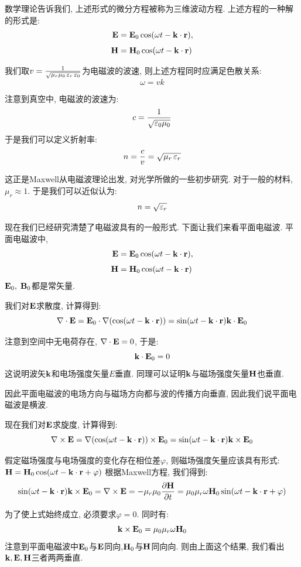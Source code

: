 数学理论告诉我们, 上述形式的微分方程被称为三维波动方程. 上述方程的一种解的形式是:
\begin{align*}
\mathbf{E} &= \mathbf{E}_0 \cos(\omega t - \mathbf k \cdot \mathbf r), \\[4pt]
\mathbf{H} &= \mathbf{H}_0 \cos(\omega t - \mathbf k \cdot \mathbf r)
\end{align*}


我们取$v=\frac{1}{\sqrt{\mu_r\mu_0\mathop{}\!\varepsilon_r\mathop{}\!\varepsilon_0}}$为电磁波的波速, 则上述方程同时应满足色散关系:
\[
\omega = vk
\]

注意到真空中, 电磁波的波速为:
\[
c= \frac{1}{\sqrt{\mathop{}\!\varepsilon_0\mu_0}}
\]
于是我们可以定义折射率:
\[
n = \frac{c}{v} = \sqrt{\mu_r\mathop{}\!\varepsilon_r}
\]

这正是Maxwell从电磁波理论出发, 对光学所做的一些初步研究. 对于一般的材料,$\mu_r\approx 1$. 于是我们可以近似认为:
\[
n = \sqrt{\mathop{}\!\varepsilon_r}
\]

现在我们已经研究清楚了电磁波具有的一般形式. 下面让我们来看平面电磁波. 平面电磁波中,
\begin{align*}
\mathbf{E} &= \mathbf{E}_0 \cos(\omega t - \mathbf k \cdot \mathbf r), \\[4pt]
\mathbf{H} &= \mathbf{H}_0 \cos(\omega t - \mathbf k \cdot \mathbf r)
\end{align*}
$\mathbf{E}_0,\; \mathbf{B}_0$都是常矢量.

我们对$\mathbf{E}$求散度, 计算得到:
\[
\nabla \cdot \mathbf{E} = \mathbf{E}_0 \cdot \nabla(\cos(\omega t -\mathbf{k}\cdot \mathbf{r})) = \sin(\omega t- \mathbf{k}\cdot \mathbf{r})\mathbf{k}\cdot \mathbf{E}_0
\]

注意到空间中无电荷存在, $\nabla \cdot \mathbf{E}=0$, 于是:
\[
\mathbf{k}\cdot \mathbf{E}_0 = 0
\]
这说明波矢$\mathbf{k}$和电场强度矢量$E$垂直. 同理可以证明$\mathbf{k}$与磁场强度矢量$\mathbf{H}$也垂直.

因此平面电磁波的电场方向与磁场方向都与波的传播方向垂直, 因此我们说平面电磁波是横波.

现在我们对$\mathbf{E}$求旋度, 计算得到:
\[
\nabla\times\mathbf{E} =  \nabla(\cos(\omega t -\mathbf{k}\cdot \mathbf{r}))\times \mathbf{E}_0 = \sin(\omega t- \mathbf{k}\cdot \mathbf{r})\mathbf{k}\times \mathbf{E}_0
\]

假定磁场强度与电场强度的变化存在相位差$\varphi$, 则磁场强度矢量应该具有形式:$\mathbf{H} = \mathbf{H}_0 \cos(\omega t - \mathbf k \cdot \mathbf r+\varphi)$ 根据Maxwell方程, 我们得到:
\[
\sin(\omega t- \mathbf{k}\cdot \mathbf{r})\mathbf{k}\times \mathbf{E}_0= \nabla \times \mathbf{E} = -\mu_r\mu_0\frac{\partial\mathbf{H}}{\partial t} = \mu_0 \mu_r \omega \mathbf{H}_0\sin(\omega t- \mathbf{k}\cdot \mathbf{r}+\varphi)
\]

为了使上式始终成立, 必须要求$\varphi = 0$. 同时有:
\[
\mathbf{k} \times \mathbf{E}_0 = \mu_0\mu_r \omega \mathbf{H}_0
\]
注意到平面电磁波中$\mathbf{E}_0$与$\mathbf{E}$同向,$\mathbf{H}_0$与$\mathbf{H}$同向向.
则由上面这个结果, 我们看出$\mathbf{k},\mathbf{E},\mathbf{H}$三者两两垂直.

